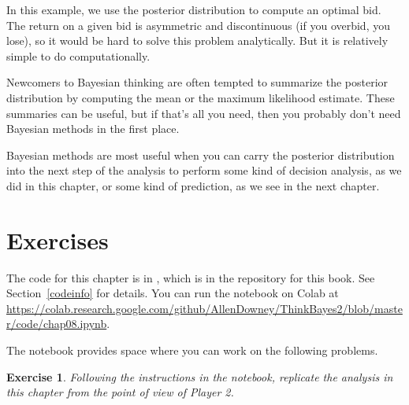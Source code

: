 \documentclass[12pt]{book}
\theoremstyle{exercise}
\newtheorem{exercise}{Exercise}[chapter]
\begin{document}
In this example, we use the posterior distribution
to compute an optimal bid.  The return on a given bid is asymmetric
and discontinuous (if you overbid, you lose), so it would be hard to
solve this problem analytically.  But it is relatively simple to do
computationally.

Newcomers to Bayesian thinking are often tempted to summarize the
posterior distribution by computing the mean or the maximum
likelihood estimate.  These summaries can be useful, but if that's
all you need, then you probably don't need Bayesian methods in the
first place.

Bayesian methods are most useful when you can carry the posterior
distribution into the next step of the analysis to perform some
kind of decision analysis, as we did in this chapter, or some kind of
prediction, as we see in the next chapter.

\section{Exercises}

The code for this chapter is in , which is in the repository for this book.  See Section~\ref{codeinfo} for details.
You can run the notebook on Colab at \url{https://colab.research.google.com/github/AllenDowney/ThinkBayes2/blob/master/code/chap08.ipynb}.

The notebook provides space where you can work on the following problems.

\begin{exercise}
Following the instructions in the notebook, replicate the analysis in this chapter from the point of view of Player 2.
\end{exercise}
\end{document}
